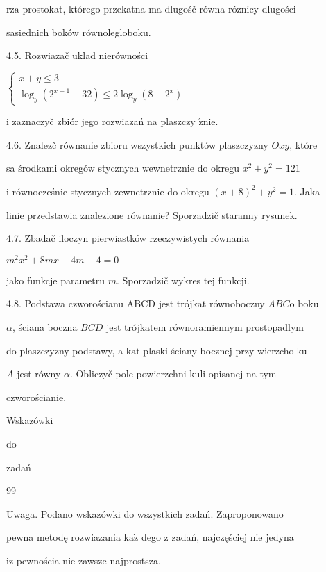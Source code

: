 \documentclass[a4paper,12pt]{article}
\begin{document}
$\mathrm{r}\mathrm{z}\mathrm{a}$ prostokat, którego przekatna ma dlugośč równa róznicy dlugości

sasiednich boków równolegloboku.

4.5. Rozwiazač uklad nierówności

$\left\{\begin{array}{l}
x+y\leq 3\\
\log_{y}(2^{x+1}+32)\leq 2\log_{y}(8-2^{x})
\end{array}\right.$

$\mathrm{i}$ zaznaczyč zbiór jego rozwiazań na plaszczy $\acute{\mathrm{z}}\mathrm{n}\mathrm{i}\mathrm{e}.$

4.6. Znalez$\acute{}$č równanie zbioru wszystkich punktów plaszczyzny $Oxy$, które

sa środkami okregów stycznych wewnetrznie do okregu $x^{2}+y^{2}=121$

$\mathrm{i}$ równocześnie stycznych zewnetrznie do okregu $(x+8)^{2}+y^{2}=1$. Jaka

linie przedstawia znalezione równanie? Sporzadzič staranny rysunek.

4.7. Zbadač iloczyn pierwiastków rzeczywistych równania

$m^{2}x^{2}+8mx+4m-4=0$

jako funkcje parametru $m$. Sporzadzič wykres tej funkcji.

4.8. Podstawa czworościanu ABCD jest trójkat równoboczny $ABC\mathrm{o}$ boku

$\alpha$, ściana boczna $BCD$ jest trójkatem równoramiennym prostopadlym

do plaszczyzny podstawy, a $\mathrm{k}\mathrm{a}\mathrm{t}$ plaski ściany bocznej przy wierzcholku

$A$ jest równy $\alpha$. Obliczyč pole powierzchni kuli opisanej na tym

czworościanie.





Wskazówki

do

zadań





99

Uwaga. Podano wskazówki do wszystkich zadań. Zaproponowano

pewna metodę rozwiazania $\mathrm{k}\mathrm{a}\dot{\mathrm{z}}$ dego $\mathrm{z}$ zadań, najczęściej nie jedyna

$\mathrm{i}\mathrm{z}$ pewnościa nie zawsze najprostsza.
\end{document}
